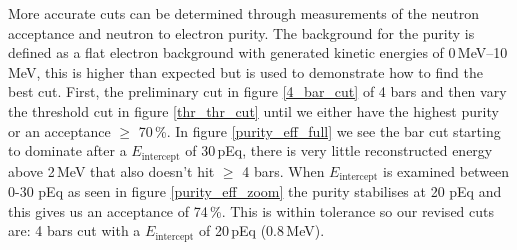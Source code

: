 \documentclass[12pt,a4paper]{article}
\begin{document}
More accurate cuts can be determined through measurements of the neutron acceptance and neutron to electron purity. The background for the purity is defined as a flat electron background with generated kinetic energies of 0\,MeV--10\,MeV, this is higher than expected but is used to demonstrate how to find the best cut. First, the preliminary cut in figure \ref{4_bar_cut} of 4 bars and then vary the threshold cut in figure \ref{thr_thr_cut} until we either have the highest purity or an acceptance $\geq$ 70\,\%. In figure \ref{purity_eff_full} we see the bar cut starting to dominate after a $E_\textrm{intercept}$ of 30\,pEq, there is very little reconstructed energy above 2\,MeV that also doesn't hit $\geq$ 4 bars. When $E_\textrm{intercept}$ is examined between 0-30 pEq as seen in figure \ref{purity_eff_zoom} the purity stabilises at 20 pEq and this gives us an acceptance of 74\,\%. This is within tolerance so our revised cuts are: 4 bars cut with a $E_\textrm{intercept}$ of 20\,pEq (0.8\,MeV). 
\end{document}
